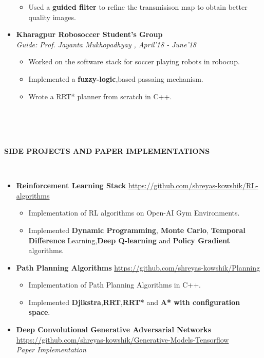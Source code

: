 \documentclass[a4paper,10pt]{article}
\newcommand{\isep}{-2 pt}
\newcommand{\lsep}{-0.5cm}
\newcommand{\resheading}[1]{{\small \colorbox{mygrey}{\begin{minipage}{0.975\textwidth}{\textbf{#1 \vphantom{p\^{E}}}}\end{minipage}}}}
\begin{document}
\begin{itemize}
\begin{itemize}
	\item Used a \textbf{guided filter} to refine the transmisison map to obtain better quality images. 
	\end{itemize} 
	
\item \textbf{Kharagpur Robosoccer Student's Group} \\ 
 \emph{Guide: Prof. Jayanta Mukhopadhyay										
, April'18 - June'18} \\[-0.6cm]
	\begin{itemize}\itemsep \isep
	\item Worked on the software stack for soccer playing robots in robocup.
	\item Implemented a \textbf{fuzzy-logic},based passaing mechanism.
	\item Wrote a RRT* planner from scratch in C++. \\ \\
	\end{itemize} 
\end{itemize}

\hspace{0.5cm}\\[-0.2cm]

\hspace{0.5cm}\\[-0.2cm]

\resheading{\textbf{SIDE PROJECTS AND PAPER IMPLEMENTATIONS} }\\[\lsep]
\begin{itemize}
\item \textbf{Reinforcement Learning Stack} \hspace{1.0cm} \url{https://github.com/shreyas-kowshik/RL-algorithms}
	\begin{itemize}\itemsep \isep
	\item Implementation of RL algorithms on Open-AI Gym Environments.
	
	\item Implemented \textbf{Dynamic Programming}, \textbf{Monte Carlo}, \textbf{Temporal Difference} Learning,\textbf{Deep Q-learning} and \textbf{Policy Gradient} algorithms. 
	\end{itemize}
	
\item \textbf{Path Planning Algorithms} \hspace{1.0cm} \url{https://github.com/shreyas-kowshik/Planning}
	\begin{itemize}\itemsep \isep
	\item Implementation of Path Planning Algorithms in C++.
	\item Implemented \textbf{Djikstra},\textbf{RRT},\textbf{RRT*} and \textbf{A* with configuration space}.
	\end{itemize}

\item \textbf{Deep Convolutional Generative Adversarial Networks} \hspace{0.5cm} \url{https://github.com/shreyas-kowshik/Generative-Models-Tensorflow} \\
\emph{Paper Implementation}

\end{itemize}
\end{document}
